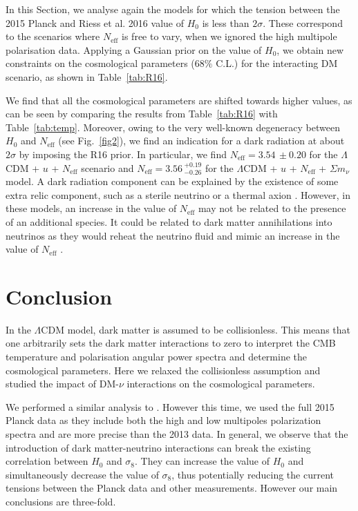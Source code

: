 \documentclass[aps,prd,a4paper,twocolumn,amsmath,showpacs,superscriptaddress,nofootinbib,preprintnumbers]{revtex4-1}
\newcommand{\neff}{N_{\mathrm{eff}}}
\newcommand{\mnu}{{\Sigma}m_{\nu}}
\begin{document}
In this Section, we analyse again the models for which the tension between the 2015 Planck and  Riess et al. 2016  \cite{R16} value of $H_0$ 
is less than $2\sigma$. These correspond to the scenarios where $\neff$ is free to vary, when we ignored the high multipole polarisation data. Applying a Gaussian prior on the value of $H_0$, we obtain new constraints on the cosmological parameters ($68 \% $ C.L.) for the interacting DM scenario, as shown in Table~\ref{tab:R16}.

We find that all the cosmological parameters are shifted towards higher values, as can be seen by comparing the results from  Table~\ref{tab:R16} with Table~\ref{tab:temp}. Moreover, owing to the very well-known degeneracy between $H_0$ and $\neff$ (see Fig.~\ref{fig2}), we find an indication for a dark radiation at about $2\sigma$ by imposing the R16 prior. In particular, we find $\neff=3.54\,\pm 0.20$ for the $\Lambda$CDM + $u$ + $\neff$ scenario and $\neff=3.56\,_{-0.26}^{+0.19}$ for the $\Lambda$CDM + $u$ + $\neff$ + $\mnu$ model. A dark radiation component can be explained by the existence of some extra relic component, such as a sterile neutrino or a thermal axion \cite{darkradiation, DiValentino:2015wba,DiValentino:2016ikp, Giusarma:2014zza, Archidiacono:2011gq}. However, in these models, an increase in the value  of $\neff$ may not be related to the presence of an additional species. It could be related to dark matter annihilations into neutrinos as they would reheat the neutrino fluid and mimic an increase in the value of $\neff$ \cite{Boehm:2012gr,Boehm:2013jpa}.

\section{Conclusion \label{sec:conclusion}}

In the $\Lambda$CDM model, dark matter is assumed to be collisionless. This means that one arbitrarily sets the dark matter interactions to zero to interpret the CMB temperature and polarisation angular power spectra and determine the cosmological parameters. Here we relaxed the collisionless  assumption and studied  the impact of DM-$\nu$ interactions on the cosmological parameters. 

We performed a similar analysis to \cite{Wilkinson:2014ksa}. However this time, we used the full 2015 Planck  data \cite{planck2015} as they include both the high and low multipoles polarization spectra and are more precise than the 2013 data. In general, we observe that the introduction of dark matter-neutrino interactions can break the existing correlation between 
$H_0$ and $\sigma_8$. They can increase the value of $H_0$ and simultaneously decrease the value of $\sigma_8$, thus potentially reducing the current tensions between the Planck data and other measurements. However our main conclusions are three-fold. 
\end{document}
